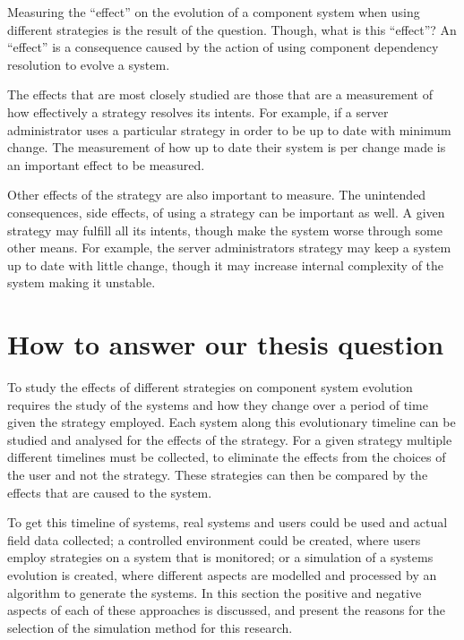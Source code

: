 Measuring the ``effect'' on the evolution of a component system when using different strategies is the result of the question. 
Though, what is this ``effect''?
An ``effect'' is a consequence caused by the action of using component dependency resolution to evolve a system.

The effects that are most closely studied are those that are a measurement of how effectively a strategy resolves its intents.
For example, if a server administrator uses a particular strategy in order to be up to date with minimum change.
The measurement of how up to date their system is per change made is an important effect to be measured.

Other effects of the strategy are also important to measure.
The unintended consequences, side effects, of using a strategy can be important as well.
A given strategy may fulfill all its intents, though make the system worse through some other means.
For example, the server administrators strategy may keep a system up to date with little change, 
though it may increase internal complexity of the system making it unstable. 

\section{How to answer our thesis question}
To study the effects of different strategies on component system evolution requires the study of the systems and how they change over a period of time given the strategy employed. 
Each system along this evolutionary timeline can be studied and analysed for the effects of the strategy.
For a given strategy multiple different timelines must be collected, to eliminate the effects from the choices of the user and not the strategy.
These strategies can then be compared by the effects that are caused to the system.

To get this timeline of systems, real systems and users could be used and actual field data collected;
a controlled environment could be created, where users employ strategies on a system that is monitored;
or a simulation of a systems evolution is created, where different aspects are modelled and processed by an algorithm to generate the systems.
In this section the positive and negative aspects of each of these approaches is discussed,
and present the reasons for the selection of the simulation method for this research.


